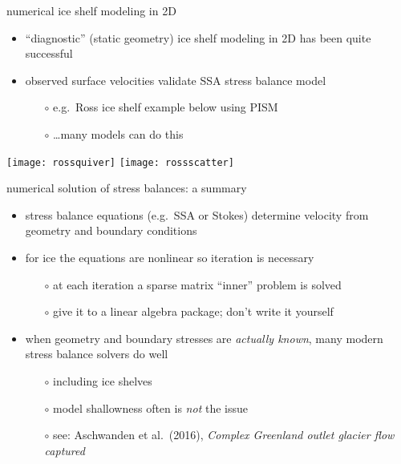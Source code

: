 \begin{frame}{numerical ice shelf modeling in 2D}

\begin{itemize}
\item ``diagnostic'' (static geometry) ice shelf modeling in 2D has been quite successful
\item observed surface velocities validate SSA stress balance model
  \begin{itemize}
  \item[$\circ$] e.g.~Ross ice shelf example below using PISM
  \item[$\circ$] \dots many models can do this
  \end{itemize}
\end{itemize}

\begin{center}
\texttt{[image: rossquiver]}  \hfill  \texttt{[image: rossscatter]}
\end{center}
\end{frame}


\begin{frame}{numerical solution of stress balances: a summary}

\begin{itemize}
\item stress balance equations (e.g.~SSA or Stokes) determine velocity from geometry and boundary conditions
\item for ice the equations are nonlinear so iteration is necessary
  \begin{itemize}
  \item[$\circ$] at each iteration a sparse matrix ``inner'' problem is solved
  \item[$\circ$] give it to a linear algebra package; don't write it yourself
  \end{itemize}
\item when geometry and boundary stresses are \emph{actually known}, many modern stress balance solvers do well
  \begin{itemize}
  \item[$\circ$] including ice shelves
  \item[$\circ$] model shallowness often is \emph{not} the issue
  \item[$\circ$] see: Aschwanden et al.~(2016), \emph{Complex Greenland outlet glacier flow captured}
  \end{itemize}
\end{itemize}
\end{frame}


